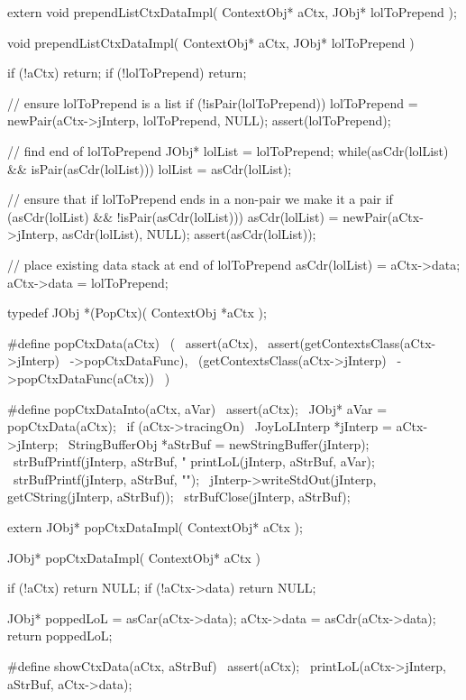 \startCHeader
extern void prependListCtxDataImpl(
  ContextObj* aCtx,
  JObj* lolToPrepend
);
\stopCHeader
{}

\startCCode
void prependListCtxDataImpl(
  ContextObj* aCtx,
  JObj* lolToPrepend
) {
  if (!aCtx) return;
  if (!lolToPrepend) return;

  // ensure lolToPrepend is a list
  if (!isPair(lolToPrepend)) {
    lolToPrepend = newPair(aCtx->jInterp, lolToPrepend, NULL);
    assert(lolToPrepend);
  }

  // find end of lolToPrepend
  JObj* lolList = lolToPrepend;
  while(asCdr(lolList) && isPair(asCdr(lolList))) {
    lolList = asCdr(lolList);
  }

  // ensure that if lolToPrepend ends in a non-pair we make it a pair
  if (asCdr(lolList) && !isPair(asCdr(lolList))) {
    asCdr(lolList) = newPair(aCtx->jInterp, asCdr(lolList), NULL);
    assert(asCdr(lolList));
  }

  // place existing data stack at end of lolToPrepend
  asCdr(lolList) = aCtx->data;
  aCtx->data     = lolToPrepend;
}
\stopCCode

\startCHeader
typedef JObj *(PopCtx)(
  ContextObj *aCtx
);

#define popCtxData(aCtx)                    \
  (                                         \
    assert(aCtx),                           \
    assert(getContextsClass(aCtx->jInterp)  \
      ->popCtxDataFunc),                    \
    (getContextsClass(aCtx->jInterp)        \
      ->popCtxDataFunc(aCtx))               \
  )

#define popCtxDataInto(aCtx, aVar)                              \
assert(aCtx);                                                   \
JObj* aVar = popCtxData(aCtx);                                  \
if (aCtx->tracingOn) {                                          \
  JoyLoLInterp *jInterp = aCtx->jInterp;                        \
  StringBufferObj *aStrBuf = newStringBuffer(jInterp);          \
  strBufPrintf(jInterp, aStrBuf, "%
  printLoL(jInterp, aStrBuf, aVar);                             \
  strBufPrintf(jInterp, aStrBuf, "\n");                         \
  jInterp->writeStdOut(jInterp, getCString(jInterp, aStrBuf));  \
  strBufClose(jInterp, aStrBuf);                                \
}
\stopCHeader

\setCHeaderStream{private}
\startCHeader
extern JObj* popCtxDataImpl(
  ContextObj* aCtx
);
\stopCHeader
\setCHeaderStream{public}

\startCCode
JObj* popCtxDataImpl(
  ContextObj* aCtx
) {
  if (!aCtx) return NULL;
  if (!aCtx->data) return NULL;

  JObj* poppedLoL = asCar(aCtx->data);
  aCtx->data          = asCdr(aCtx->data);
  return poppedLoL;
}
\stopCCode

\startCHeader
#define showCtxData(aCtx, aStrBuf)              \
  assert(aCtx);                                 \
  printLoL(aCtx->jInterp, aStrBuf, aCtx->data); \
\stopCHeader

